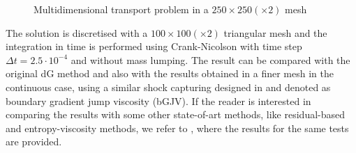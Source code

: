 \begin{figure}%
\centering
{}%
\caption{Multidimensional transport problem in a $250\times 250 (\times 2)$ mesh}\label{fig-algo_2}
\end{figure}


The solution is discretised with a $100 \times 100 (\times 2)$ triangular mesh and the integration in time is performed using Crank-Nicolson with time step $\Delta t = 2.5\cdot 10^{-4}$ and without mass lumping. The result can be compared with the original dG method and also with the results obtained in a finer mesh in the continuous case, using a similar shock capturing designed in \cite{ourpaper} and denoted as boundary gradient jump viscosity (bGJV). { If the reader is interested in comparing the results with some other state-of-art methods, like residual-based and entropy-viscosity methods, we refer to \cite{ourpaper}, where the results for the same tests are provided}. 

